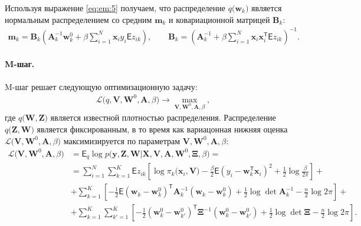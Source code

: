 Используя выражение \eqref{eq:em:5} получаем, что  распределение $q\bigr(\mathbf{w}_{k}\bigr)$ является нормальным распределением со средним $\mathbf{m}_{k}$ и ковариационной матрицей $\mathbf{B}_k$:
\[
\label{eq:em:6}
\begin{aligned}
\mathbf{m}_{k} = \mathbf{B}_{k}\left(\mathbf{A}_{k}^{-1}\mathbf{w}_{k}^{0}+\beta\sum_{i=1}^{N}\mathbf{x}_{i}y_{i}\mathsf{E}z_{ik}\right), \qquad \mathbf{B}_{k} = \left(\mathbf{A}_{k}^{-1}+\beta\sum_{i=1}^{N}\mathbf{x}_{i}\mathbf{x}_{i}^{\mathsf{T}}\mathsf{E}z_{ik}\right)^{-1}.
\end{aligned}
\]

\paragraph{M-шаг.} M-шаг решает следующую оптимизационную задачу:
\[
\label{eq:em:new:3}
\begin{aligned}
\mathcal{L}\bigr(q, \textbf{V}, \textbf{W}^{0}, \textbf{A}, \beta\bigr) \to \max_{\textbf{V}, \textbf{W}^{0}, \textbf{A}, \beta},
\end{aligned}
\]
где $q\bigr(\textbf{W}, \textbf{Z}\bigr)$ является известной плотностью распределения.
Распределение $q\bigr(\mathbf{Z}, \mathbf{W}\bigr)$ является фиксированным, в то время как вариацонная нижняя оценка $\mathcal{L}\bigr(\textbf{V}, \textbf{W}^{0}, \textbf{A}, \beta\bigr)$ максимизируется по параметрам $\mathbf{V}, \mathbf{W}^0, \textbf{A},  \beta$:
\[
\label{eq:em:7}
\begin{aligned}
\mathcal{L}\bigr(\textbf{V}, \textbf{W}^{0}, \textbf{A}, \beta\bigr) &= \mathsf{E}_{q}\log p\bigr(\mathbf{y}, \mathbf{Z}, \mathbf{W}|\mathbf{X}, \mathbf{V}, \textbf{A}, \textbf{W}^{0}, \bm{\Xi}, \beta\bigr) =  \\
&= \sum_{i=1}^{N}\sum_{k=1}^{K}\mathsf{E}z_{ik}\left[\log\pi_k\bigr(\textbf{x}_i, \textbf{V}\bigr) - \frac{\beta}{2}\mathsf{E}\left(y_{i} - \textbf{w}_{k}^{\mathsf{T}}\textbf{x}_{i}\right)^{2} + \frac{1}{2}\log\frac{\beta}{2\pi}\right] +\\
&+ \sum_{k=1}^{K}\left[-\frac{1}{2}\mathsf{E}\left(\textbf{w}_{k} - \textbf{w}_{k}^{0}\right)^{\mathsf{T}}\textbf{A}_{k}^{-1}\left(\textbf{w}_{k} - \textbf{w}_{k}^{0}\right) + \frac{1}{2}\log\det\textbf{A}^{-1}_{k} - \frac{n}{2}\log2\pi\right] +\\
&+ \sum_{k=1}^{K}\sum_{k'=1}^{K}\left[-\frac{1}{2}\left(\textbf{w}_{k}^{0}-\textbf{w}_{k'}^{0}\right)^{\mathsf{T}}\bm{\Xi}^{-1}\left(\textbf{w}_{k}^{0}-\textbf{w}_{k'}^{0}\right) +\frac{1}{2}\log\det\bm{\Xi} -\frac{n}{2}\log{2\pi}\right].
\end{aligned}
\]
